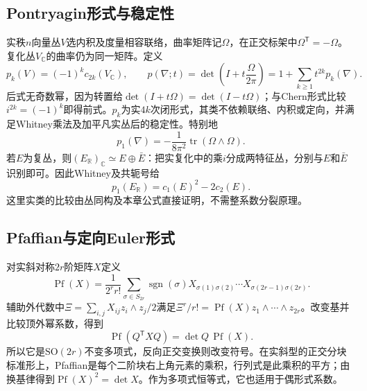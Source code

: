 \subsection{Pontryagin形式与稳定性}
实秩$n$向量丛$V$选内积及度量相容联络，曲率矩阵记$\Omega$，在正交标架中$\Omega^{\mathsf T}=-\Omega$。复化丛$V_{\mathbb C}$的曲率仍为同一矩阵。定义
\begin{equation}\label{eq:pontryagin}
 p_k(V)=(-1)^kc_{2k}(V_{\mathbb C}),\qquad
 p(\nabla;t)=\det\left(I+t\frac{\Omega}{2\pi}\right)
 =1+\sum_{k\geq1}t^{2k}p_k(\nabla).
\end{equation}
后式无奇数幂，因为转置给$\det(I+t\Omega)=\det(I-t\Omega)$；与Chern形式比较$i^{2k}=(-1)^k$即得前式。$p_k$为实$4k$次闭形式，其类不依赖联络、内积或定向，并满足Whitney乘法及加平凡实丛后的稳定性。特别地
\[
 p_1(\nabla)=-\frac1{8\pi^2}\operatorname{tr}(\Omega\wedge\Omega).
\]
若$E$为复丛，则$(E_{\mathbb R})_{\mathbb C}\simeq E\oplus\bar E$：把实复化中的乘$i$分成两特征丛，分别与$E$和$\bar E$识别即可。因此Whitney及共轭号给
\begin{equation}\label{eq:p1-underlying-complex}
 p_1(E_{\mathbb R})=c_1(E)^2-2c_2(E).
\end{equation}
这里实类的比较由丛同构及本章公式直接证明，不需整系数分裂原理。

\subsection{Pfaffian与定向Euler形式}
对实斜对称$2r$阶矩阵$X$定义
\[
 \operatorname{Pf}(X)=\frac1{2^r r!}
 \sum_{\sigma\in S_{2r}}\operatorname{sgn}(\sigma)
 X_{\sigma(1)\sigma(2)}\cdots X_{\sigma(2r-1)\sigma(2r)}.
\]
辅助外代数中$\Xi=\sum_{i,j}X_{ij}z_i\wedge z_j/2$满足$\Xi^r/r!=\operatorname{Pf}(X)z_1\wedge\cdots\wedge z_{2r}$。改变基并比较顶外幂系数，得到
\[
 \operatorname{Pf}(Q^{\mathsf T}XQ)=\det Q\,\operatorname{Pf}(X).
\]
所以它是$\mathrm{SO}(2r)$不变多项式，反向正交变换则改变符号。在实斜型的正交分块标准形上，Pfaffian是每个二阶块右上角元素的乘积，行列式是此乘积的平方；由换基律得到$\operatorname{Pf}(X)^2=\det X$。作为多项式恒等式，它也适用于偶形式系数。


